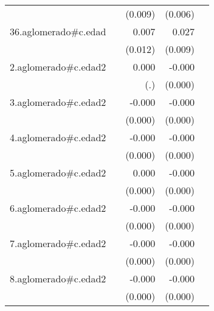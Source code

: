 {\begin{longtable}{l*{4}{D{.}{.}{-1}}}
            &                     &     (0.009)         &     (0.006)         &                     \\
\addlinespace
36.aglomerado#c.edad&                     &       0.007         &       0.027\sym{**} &                     \\
            &                     &     (0.012)         &     (0.009)         &                     \\
\addlinespace
2.aglomerado#c.edad2&                     &       0.000         &      -0.000\sym{*}  &                     \\
            &                     &         (.)         &     (0.000)         &                     \\
\addlinespace
3.aglomerado#c.edad2&                     &      -0.000         &      -0.000\sym{***}&                     \\
            &                     &     (0.000)         &     (0.000)         &                     \\
\addlinespace
4.aglomerado#c.edad2&                     &      -0.000         &      -0.000\sym{**} &                     \\
            &                     &     (0.000)         &     (0.000)         &                     \\
\addlinespace
5.aglomerado#c.edad2&                     &       0.000         &      -0.000         &                     \\
            &                     &     (0.000)         &     (0.000)         &                     \\
\addlinespace
6.aglomerado#c.edad2&                     &      -0.000         &      -0.000\sym{***}&                     \\
            &                     &     (0.000)         &     (0.000)         &                     \\
\addlinespace
7.aglomerado#c.edad2&                     &      -0.000         &      -0.000         &                     \\
            &                     &     (0.000)         &     (0.000)         &                     \\
\addlinespace
8.aglomerado#c.edad2&                     &      -0.000         &      -0.000         &                     \\
            &                     &     (0.000)         &     (0.000)         &                     \\

\end{longtable}}
